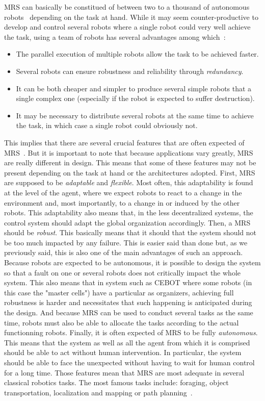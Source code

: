     MRS can basically be constitued of between two to a thousand of autonomous robots~\cite{Rubenstein2014} depending on the task at hand. While it may seem counter-productive to develop and control several robots where a single robot could very well achieve the task, using a team of robots has several advantages among which~\cite{Cao1997, Arkin1998}:

    \begin{itemize}
      \item{The parallel execution of multiple robots allow the task to be achieved faster.}
      \item{Several robots can ensure robustness and reliability through \emph{redundancy}.}
      \item{It can be both cheaper and simpler to produce several simple robots that a single complex one (especially if the robot is expected to suffer destruction).}
      \item{It may be necessary to distribute several robots at the same time to achieve the task, in which case a single robot could obviously not.}
    \end{itemize}

    This implies that there are several crucial features that are often expected of MRS~\cite{Parker1994}. But it is important to note that because applications vary greatly, MRS are really different in design. This means that some of these features may not be present depending on the task at hand or the architectures adopted. First, MRS are supposed to be \emph{adaptable} and \emph{flexible}. Most often, this adaptability is found at the level of the agent, where we expect robots to react to a change in the environment and, most importantly, to a change in or induced by the other robots. This adaptability also means that, in the less decentralized systems, the control system should adapt the global organization accordingly. Then, a MRS should be \emph{robust}. This basically means that it should that the system should not be too much impacted by any failure. This is easier said than done but, as we previously said, this is also one of the main advantages of such an approach. Because robots are expected to be autonomous, it is possible to design the system so that a fault on one or several robots does not critically impact the whole system. This also means that in system such as CEBOT where some robots (in this case the "master cells") have a particular as organizers, achieving full robustness is harder and necessitates that such happening is anticipated during the design. And because MRS can be used to conduct several tasks as the same time, robots must also be able to allocate the tasks according to the actual functionning robots. Finally, it is often expected of MRS to be fully \emph{autonomous}. This means that the system as well as all the agent from which it is comprised should be able to act without human intervention. In particular, the system should be able to face the unexpected without having to wait for human control for a long time. Those features mean that MRS are most adequate in several classical robotics tasks. The most famous tasks include: foraging, object transportation, localization and mapping or path planning~\cite{Farinelli2004}.

